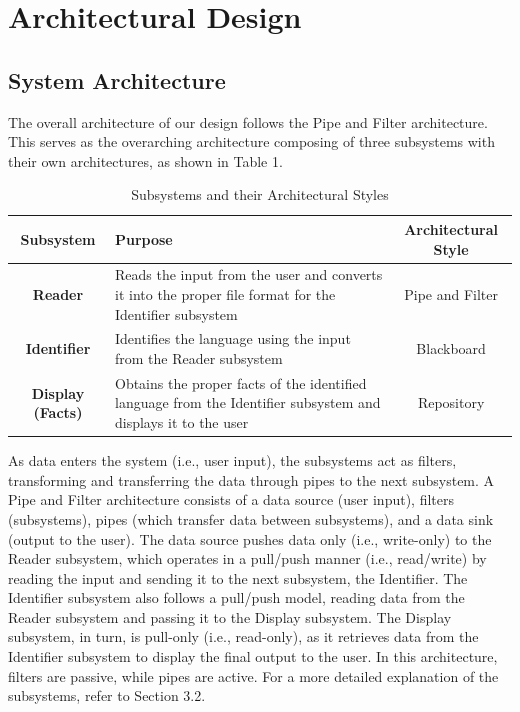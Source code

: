 \section{Architectural Design }
\label{sec:architectural_design}

\subsection{System Architecture}
\label{sub:system_architecture}
The overall architecture of our design follows the Pipe and Filter architecture. This serves as the overarching architecture composing of three subsystems with their own architectures, as shown in Table 1.

\begin{table}[h]
    \centering
    \renewcommand{\arraystretch}{1.5}
    \begin{tabular}{|c|p{8cm}|c|}
        \hline
        \textbf{Subsystem} & \textbf{Purpose} & \textbf{Architectural Style} \\
        \hline
        \textbf{Reader} & Reads the input from the user and converts it into the proper file format for the Identifier subsystem & Pipe and Filter \\
        \hline
        \textbf{Identifier} & Identifies the language using the input from the Reader subsystem & Blackboard \\
        \hline
        \textbf{Display (Facts)} & Obtains the proper facts of the identified language from the Identifier subsystem and displays it to the user & Repository \\
        \hline
    \end{tabular}
    \caption{Subsystems and their Architectural Styles}
    \label{tab:subsystems}
\end{table}

\noindent
As data enters the system (i.e., user input), the subsystems act as filters, transforming and transferring the data through pipes to the next subsystem. A Pipe and Filter architecture consists of a data source (user input), filters (subsystems), pipes (which transfer data between subsystems), and a data sink (output to the user).
The data source pushes data only (i.e., write-only) to the Reader subsystem, which operates in a pull/push manner (i.e., read/write) by reading the input and sending it to the next subsystem, the Identifier. The Identifier subsystem also follows a pull/push model, reading data from the Reader subsystem and passing it to the Display subsystem. The Display subsystem, in turn, is pull-only (i.e., read-only), as it retrieves data from the Identifier subsystem to display the final output to the user.
In this architecture, filters are passive, while pipes are active. For a more detailed explanation of the subsystems, refer to Section 3.2.

